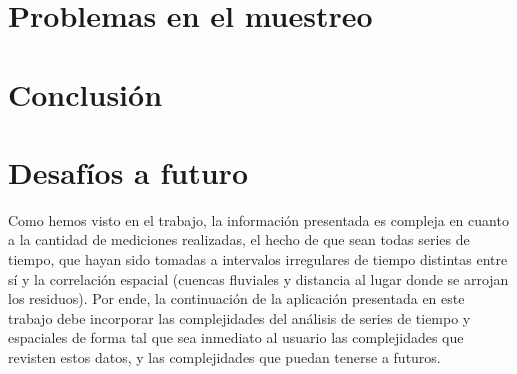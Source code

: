 \documentclass[a4paper, twopager]{article}
\begin{document}
\section{Problemas en el muestreo}
\section{Conclusión}
\section{Desafíos a futuro}
Como hemos visto en el trabajo, la información presentada es compleja en cuanto a la cantidad de mediciones realizadas, el hecho de que sean todas series de tiempo, que hayan sido tomadas a intervalos irregulares de tiempo distintas entre sí y la correlación espacial (cuencas fluviales y distancia al lugar donde se arrojan los residuos). Por ende, la continuación de la aplicación presentada en este trabajo debe incorporar las complejidades del análisis de series de tiempo y espaciales de forma tal que sea inmediato al usuario las complejidades que revisten estos datos, y las complejidades que puedan tenerse a futuros.
\end{document}
